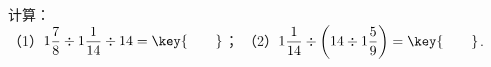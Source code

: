 计算：\\
（1）$1\dfrac{7}{8}\div1\dfrac{1}{14}\div14=\key{\qquad}$；\hspace{3cm}
（2）$1\dfrac{1}{14}\div\left(14\div1\dfrac{5}{9}\right)=\key{\qquad}$.